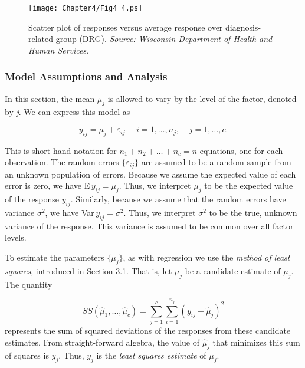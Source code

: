 \linejed

\begin{figure}[htp]
  \begin{center}
    \texttt{[image: Chapter4/Fig4\_4.ps]}
    \caption{\label{F4:DRGObsFits} \small  Scatter plot of responses versus average response over diagnosis-related
group (DRG). \textit{Source: Wisconsin Department of Health and
Human Services}.}
  \end{center}
\end{figure}



\subsubsection*{Model Assumptions and Analysis}

In this section, the mean $\mu_j$ is allowed to vary by the level of
the factor, denoted by \textit{j}. We can express this model as

\begin{equation*}
y_{ij}=\mu _{j}+ \varepsilon_{ij}\ \ \ \ \ \ i=1,\ldots ,n_{j},\ \ \
\ \ j=1,\ldots ,c.
\end{equation*}

This is short-hand notation for $n_{1}+n_{2}+\ldots +n_{c}=n$
equations, one for each observation. The random errors $\{
\varepsilon_{ij} \}$ are assumed to be a random sample from an
unknown population of errors. Because we assume the expected value
of each error is zero, we have E$\,y_{ij}=\mu _{j}$. Thus, we
interpret $\mu _{j}$ to be the expected value of the response
$y_{ij}$. Similarly, because we assume that the random errors have
variance $\sigma ^{2}$, we have Var$\,y_{ij}=\sigma ^{2}$. Thus, we
interpret $\sigma ^{2}$ to be the true, unknown variance of the
response. This variance is assumed to be common over all factor
levels.

To estimate the parameters $\{\mu _{j}\}$, as with regression we use
the \textit{method of least squares}, introduced in Section 3.1.
That is, let $\hat{\mu}_j$ be a candidate estimate of $\mu_{j}$. The
quantity

\begin{equation*}
SS(\hat{\mu}_{1},\ldots
,\hat{\mu}_{c})=\sum_{j=1}^{c}\sum_{i=1}^{n_{j}}(y_{ij}-\hat{\mu}_{j})^{2}
\end{equation*}%
represents the sum of squared deviations of the responses from these
candidate estimates. From straight-forward algebra, the value of
$\hat{\mu}_j$ that minimizes this sum of squares is $\bar{y}_{j}$.
Thus, $\bar{y}_{j}$ is the \textit{least squares estimate }of $\mu
_{j}$.

